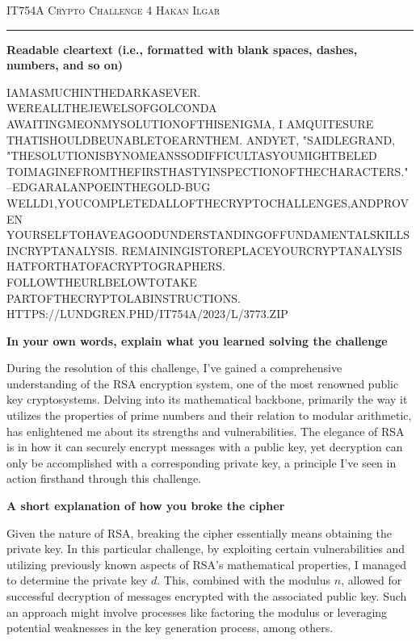 \documentclass[12pt]{amsart}
\begin{document}
\thispagestyle{empty}

{\scshape IT754A} \hfill {\scshape \large Crypto Challenge 4} \hfill {\scshape Hakan Ilgar}

\smallskip
\hrule
\bigskip
\bigskip

{\bf Readable cleartext (i.e., formatted with blank spaces, dashes, numbers, and so on)}
\bigskip

\noindent
IAMASMUCHINTHEDARKASEVER. WEREALLTHEJEWELSOFGOLCONDA \\
AWAITINGMEONMYSOLUTIONOFTHISENIGMA, I AMQUITESURE \\
THATISHOULDBEUNABLETOEARNTHEM. ANDYET, "SAIDLEGRAND, \\
"THESOLUTIONISBYNOMEANSSODIFFICULTASYOUMIGHTBELED \\
TOIMAGINEFROMTHEFIRSTHASTYINSPECTIONOFTHECHARACTERS." \\
--EDGARALANPOEINTHEGOLD-BUG \\
WELLD1,YOUCOMPLETEDALLOFTHECRYPTOCHALLENGES,ANDPROVEN \\
YOURSELFTOHAVEAGOODUNDERSTANDINGOFFUNDAMENTALSKILLS \\
INCRYPTANALYSIS. REMAININGISTOREPLACEYOURCRYPTANALYSIS \\
HATFORTHATOFACRYPTOGRAPHERS. FOLLOWTHEURLBELOWTOTAKE \\
PARTOFTHECRYPTOLABINSTRUCTIONS. \\
HTTPS://LUNDGREN.PHD/IT754A/2023/L/3773.ZIP

\bigskip

{\bf In your own words, explain what you learned solving the challenge}
\bigskip

During the resolution of this challenge, I've gained a comprehensive understanding of the RSA encryption system, one of the most renowned public key cryptosystems. Delving into its mathematical backbone, primarily the way it utilizes the properties of prime numbers and their relation to modular arithmetic, has enlightened me about its strengths and vulnerabilities. The elegance of RSA is in how it can securely encrypt messages with a public key, yet decryption can only be accomplished with a corresponding private key, a principle I've seen in action firsthand through this challenge.

\bigskip

{\bf A short explanation of how you broke the cipher}
\bigskip

Given the nature of RSA, breaking the cipher essentially means obtaining the private key. In this particular challenge, by exploiting certain vulnerabilities and utilizing previously known aspects of RSA's mathematical properties, I managed to determine the private key \(d\). This, combined with the modulus \(n\), allowed for successful decryption of messages encrypted with the associated public key. Such an approach might involve processes like factoring the modulus or leveraging potential weaknesses in the key generation process, among others.
\end{document}
